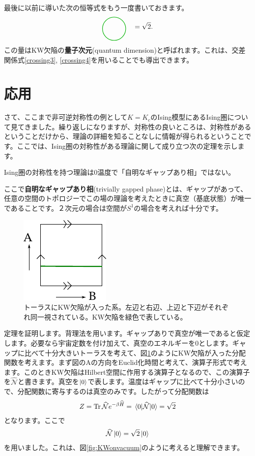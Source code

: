 \documentclass[report,paper=a4, fontsize=12pt, line_length=16cm, number_of_lines=33,dvipdfmx]{jlreq}
\newcommand{\kyou}[1]{{\sffamily \bfseries #1}}
\numberwithin{equation}{chapter}
\newcommand{\Hh}{\widehat{H}}
\newcommand{\Nh}{\widehat{\mathcal{N}}}
\begin{document}
最後に以前に導いた次の恒等式をもう一度書いておきます。
\begin{align}
  \begin{tikzpicture}[baseline=0cm]
     \draw[darkgreen, thick](0,0) circle [radius=0.6];   
  \end{tikzpicture}
  \quad = \sqrt{2}.
\end{align}
この量はKW欠陥の\kyou{量子次元}(quantum dimension)と呼ばれます。これは、交差関係式\eqref{crossing3}, \eqref{crossing4}を用いることでも導出できます。

\section{応用}
さて、ここまで非可逆対称性の例として$K=K_c$のIsing模型にあるIsing圏について見てきました。繰り返しになりますが、対称性の良いところは、対称性があるということだけから、理論の詳細を知ることなしに情報が得られるということです。ここでは、Ising圏の対称性がある理論に関して成り立つ次の定理を示します\cite{Chang:2018iay}。

\begin{proposition}[定理]
  Ising圏の対称性を持つ理論は$0$温度で「自明なギャップあり相」ではない。
\end{proposition}

ここで\kyou{自明なギャップあり相}(trivially gapped phase)とは、ギャップがあって、任意の空間のトポロジーでこの場の理論を考えたときに真空（基底状態）が唯一であることです。２次元の場合は空間が$S^1$の場合を考えれば十分です。

\begin{figure}
  \centering
  \includegraphics{defectontorus.pdf}
  \caption{トーラスにKW欠陥が入った系。左辺と右辺、上辺と下辺がそれぞれ同一視されている。KW欠陥を緑色で表している。}
  \label{fig:defectontorus}
\end{figure}

定理を証明します。背理法を用います。ギャップありで真空が唯一であると仮定します。必要なら宇宙定数を付け加えて、真空のエネルギーを$0$とします。ギャップに比べて十分大きいトーラスを考えて、図\ref{fig:defectontorus}のようにKW欠陥が入った分配関数を考えます。まず図のAの方向をEuclid化時間と考えて、演算子形式で考えます。このときKW欠陥はHilbert空間に作用する演算子となるので、この演算子を$\Nh$と書きます。真空を$\ket{0}$で表します。温度はギャップに比べて十分小さいので、分配関数に寄与するのは真空のみです。したがって分配関数は
\begin{align}
  Z=\Tr \Nh e^{-\beta \Hh}=\ev{\Nh}{0}=\sqrt{2}\label{tempproofnontrivial}
\end{align}
となります。ここで
\begin{align}
  \Nh\ket{0}=\sqrt{2}\ket{0}
\end{align}
を用いました。これは、図\ref{fig:KWonvacuum}のように考えると理解できます。
\end{document}
